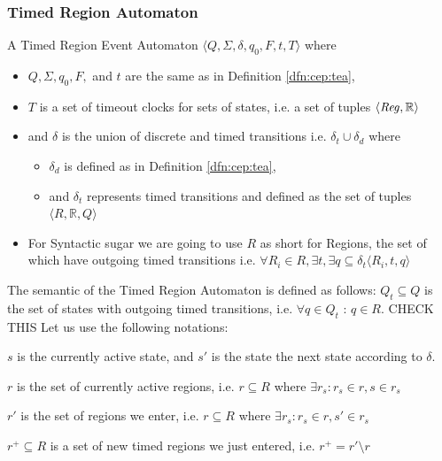			\subsubsection{Timed Region Automaton}
				\begin{dfn}
					\label{dfn:cep:trea}
					A Timed Region Event Automaton $\langle Q,\Sigma,\delta,q_0, F, t, T \rangle$ where
					\begin{itemize}
						\item $Q, \Sigma, q_0, F,$ and  $t$ are the same as in Definition \ref{dfn:cep:tea},
						\item $T$ is a set of timeout clocks for sets of states, i.e. a set of tuples $\langle \mathit{Reg}, \mathbb{R} \rangle$
						\item and $\delta$ is the union of discrete and timed transitions i.e. $\delta_t \cup \delta_d$ where
						\begin{itemize}
							\item $\delta_d$ is defined as in Definition \ref{dfn:cep:tea},
							\item and $\delta_t$ represents timed transitions and defined as the set of tuples $\langle R , \mathbb{R} , Q \rangle$ 
						\end{itemize}
						\item For Syntactic sugar we are going to use $R$ as short for Regions, the set of which have outgoing timed transitions 
						i.e. $ \forall R_i \in R , \exists t, \exists q  \subseteq \delta_t \langle R_i, t, q \rangle$ 
					\end{itemize}
				\end{dfn}
				
				The semantic of the Timed Region Automaton is defined as follows:
				$Q_t \subseteq Q$ is the set of states with outgoing timed transitions, 
				i.e. $\forall q \in Q_t$ : $ q \in R $. CHECK THIS
				Let us use the following notations: 
			
				$s$ is the currently active state, and $s'$ is the state the next state according to $\delta$.
			
				$r$ is the set of currently active regions, 
				i.e. $r \subseteq R$ where $\exists r_s : r_s \in r, s \in r_s $ 
				
				$r'$ is the set of regions we enter,
				i.e. $r \subseteq R$ where $\exists r_s :  r_s \in r, s' \in r_s $ 
				
				$r^+ \subseteq R$ is a set of new timed regions we just entered,
				i.e. $r^+ = r' \setminus r$ 
				
